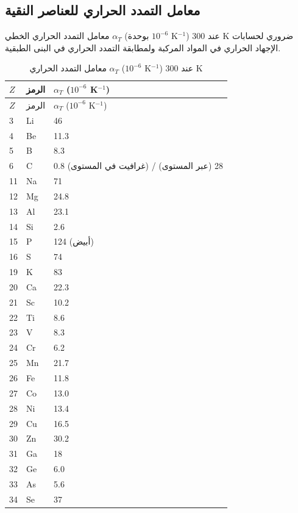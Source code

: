 \documentclass[11pt,a4paper]{article}
\begin{document}
\begin{otherlanguage}{arabic}
		\subsection{معامل التمدد الحراري للعناصر النقية}
		\label{subsec:thermal-expansion}
		
		معامل التمدد الحراري الخطي \(\alpha_T\) (بوحدة \(10^{-6}\) K\(^{-1}\)) عند 300 K ضروري لحسابات الإجهاد الحراري في المواد المركبة ولمطابقة التمدد الحراري في البنى الطبقية.
		
		\begin{longtable}{p{0.6cm}p{1.2cm}p{1.5cm}}
			\caption{معامل التمدد الحراري \(\alpha_T\) (\(10^{-6}\) K\(^{-1}\)) عند 300 K} \label{tab:thermal-expansion-all} \\
			\toprule
			\(Z\) & الرمز & \(\alpha_T\) (\(10^{-6}\) K\(^{-1}\)) \\
			\midrule
			\endfirsthead
			\toprule
			\(Z\) & الرمز & \(\alpha_T\) (\(10^{-6}\) K\(^{-1}\)) \\
			\midrule
			\endhead
			3  & Li & 46 \\
			4  & Be & 11.3 \\
			5  & B  & 8.3 \\
			6  & C  & 0.8 (غرافيت في المستوى) / 28 (عبر المستوى) \\
			11 & Na & 71 \\
			12 & Mg & 24.8 \\
			13 & Al & 23.1 \\
			14 & Si & 2.6 \\
			15 & P  & 124 (أبيض) \\
			16 & S  & 74 \\
			19 & K  & 83 \\
			20 & Ca & 22.3 \\
			21 & Sc & 10.2 \\
			22 & Ti & 8.6 \\
			23 & V  & 8.3 \\
			24 & Cr & 6.2 \\
			25 & Mn & 21.7 \\
			26 & Fe & 11.8 \\
			27 & Co & 13.0 \\
			28 & Ni & 13.4 \\
			29 & Cu & 16.5 \\
			30 & Zn & 30.2 \\
			31 & Ga & 18 \\
			32 & Ge & 6.0 \\
			33 & As & 5.6 \\
			34 & Se & 37 \\

\end{longtable}
\end{otherlanguage}
\end{document}
